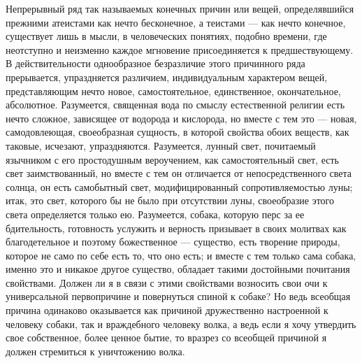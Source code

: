\documentclass[12pt]{article}
\begin{document}
Непрерывный ряд так называемых конечных причин или вещей, определявшийся прежними атеистами как нечто бесконечное, а теистами --- как нечто конечное, существует лишь в мысли, в человеческих понятиях, подобно времени, где неотступно и неизменно каждое мгновение присоединяется к предшествующему. В действительности однообразное безразличие этого причинного ряда прерывается, упраздняется различием, индивидуальным характером вещей, представляющим нечто новое, самостоятельное, единственное, окончательное, абсолютное. Разумеется, священная вода по смыслу естественной религии есть нечто сложное, зависящее от водорода и кислорода, но вместе с тем это --- новая, самодовлеющая, своеобразная сущность, в которой свойства обоих веществ, как таковые, исчезают, упраздняются. Разумеется, лунный свет, почитаемый язычником с его простодушным вероучением, как самостоятельный свет, есть свет заимствованный, но вместе с тем он отличается от непосредственного света солнца, он есть самобытный свет, модифицированный сопротивляемостью луны; итак, это свет, которого бы не было при отсутствии луны, своеобразие этого света определяется только ею. Разумеется, собака, которую перс за ее бдительность, готовность услужить и верность призывает в своих молитвах как благодетельное и поэтому божественное --- существо, есть творение природы, которое не само по себе есть то, что оно есть; и вместе с тем только сама собака, именно это и никакое другое существо, обладает такими достойными почитания свойствами. Должен ли я в связи с этими свойствами возносить свои очи к универсальной первопричине и повернуться спиной к собаке? Но ведь всеобщая причина одинаково оказывается как причиной дружественно настроенной к человеку собаки, так и враждебного человеку волка, а ведь если я хочу утвердить свое собственное, более ценное бытие, то вразрез со всеобщей причиной я должен стремиться к уничтожению волка.



\section{}
\end{document}

